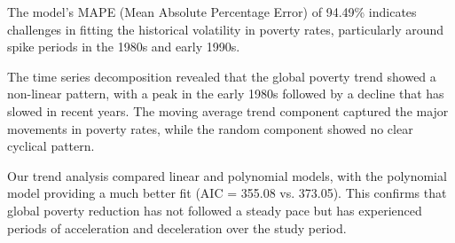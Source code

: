 \documentclass[12pt,a4paper]{article}
\begin{document}
The model's MAPE (Mean Absolute Percentage Error) of 94.49\% indicates challenges in fitting the historical volatility in poverty rates, particularly around spike periods in the 1980s and early 1990s.

The time series decomposition revealed that the global poverty trend showed a non-linear pattern, with a peak in the early 1980s followed by a decline that has slowed in recent years. The moving average trend component captured the major movements in poverty rates, while the random component showed no clear cyclical pattern.

Our trend analysis compared linear and polynomial models, with the polynomial model providing a much better fit (AIC = 355.08 vs. 373.05). This confirms that global poverty reduction has not followed a steady pace but has experienced periods of acceleration and deceleration over the study period.
\end{document}
